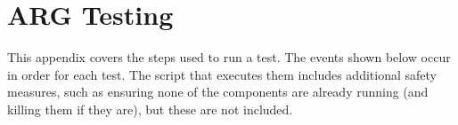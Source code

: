 \chapter{\ac{ARG} Testing}
\label{chp:testseq}
\par This appendix covers the steps used to run a test. The events shown below occur in order for each test. The script that executes them includes additional safety measures, such as ensuring none of the components are already running (and killing them if they are), but these are not included.

\begin{comment}
\section{Network Setup}
\par As Section \ref{sec:evaluation_technique} discusses, tests are run on a seven-node network, laid out as illustrated in Figure \ref{fig:argnetwork_app}.
\begin{figure}
	\centering
	\caption{ARG Network Layout Overview}
	\label{fig:argnetwork_app}
	\texttt{[image: thesis\_network]}
\end{figure}

\section{Test Sequence}
\end{comment}

